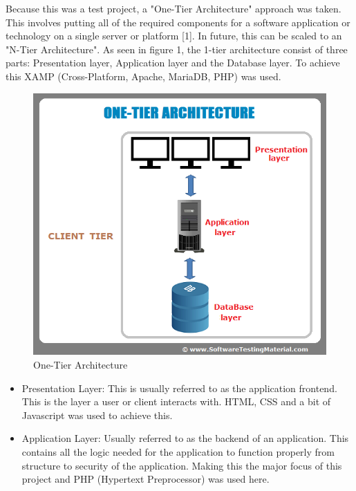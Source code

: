 \documentclass[12pt,a4paper]{article}
\begin{document}
\begin{flushleft}
	Because this was a test project, a "One-Tier Architecture" approach was taken. This involves putting all of the required components for a software application or technology on a single server or platform [1]. In future, this can be scaled to an "N-Tier Architecture".  As seen in figure 1, the 1-tier architecture consist of three parts: Presentation layer, Application layer and the Database layer. To achieve this XAMP (Cross-Platform, Apache, MariaDB, PHP) was used. 
	\begin{figure}[h]
			\begin{center}
				\includegraphics[scale = 0.3]{one-tier-software-architecture}
			
			\caption{One-Tier Architecture}
			
			\end{center}
		\end{figure}
		
	\begin{itemize}
		\item 	Presentation Layer: This is usually referred to as the application frontend. This is the layer a user or client interacts with. HTML, CSS and a bit of Javascript was used to achieve this.
		
		\item Application Layer: Usually referred to as the backend of an application. This contains all the logic needed for the application to function properly from structure to security of the application. Making this the major focus of this project and PHP (Hypertext Preprocessor) was used here.
		

\end{itemize}
\end{flushleft}
\end{document}
